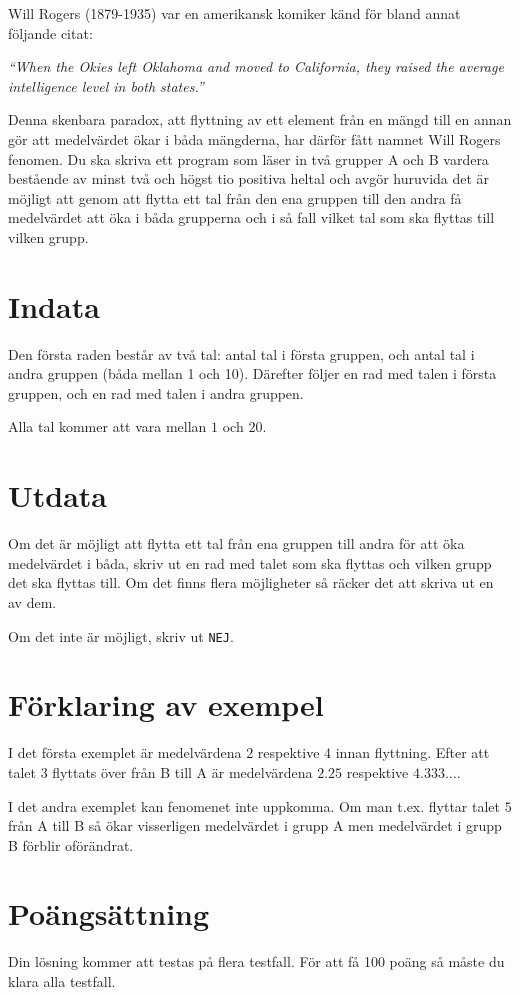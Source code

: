Will Rogers (1879-1935) var en amerikansk komiker känd för bland annat följande citat:

\emph{``When the Okies left Oklahoma and moved to California, they raised the average intelligence level in both states.''}

Denna skenbara paradox, att flyttning av ett element från en mängd till en annan gör att medelvärdet ökar i båda mängderna, har därför fått namnet Will Rogers fenomen.
Du ska skriva ett program som läser in två grupper A och B vardera bestående av minst två och högst tio positiva heltal och avgör huruvida det är möjligt att genom att flytta ett tal från den ena gruppen till den andra få medelvärdet att öka i båda grupperna och i så fall vilket tal som ska flyttas till vilken grupp.

\section*{Indata}
Den första raden består av två tal: antal tal i första gruppen, och antal tal i andra gruppen (båda mellan 1 och 10).
Därefter följer en rad med talen i första gruppen, och en rad med talen i andra gruppen.

Alla tal kommer att vara mellan $1$ och $20$.

\section*{Utdata}
Om det är möjligt att flytta ett tal från ena gruppen till andra för att öka medelvärdet i båda,
skriv ut en rad med talet som ska flyttas och vilken grupp det ska flyttas till.
Om det finns flera möjligheter så räcker det att skriva ut en av dem.

Om det inte är möjligt, skriv ut \texttt{NEJ}.

\section*{Förklaring av exempel}
I det första exemplet är medelvärdena $2$ respektive $4$ innan flyttning.
Efter att talet $3$ flyttats över från B till A är medelvärdena $2.25$ respektive $4.333\ldots$.

I det andra exemplet kan fenomenet inte uppkomma.
Om man t.ex. flyttar talet $5$ från A till B så ökar visserligen medelvärdet i grupp A men medelvärdet i grupp B förblir oförändrat.

\section*{Poängsättning}
Din lösning kommer att testas på flera testfall. För att få 100 poäng så måste du klara
alla testfall.
